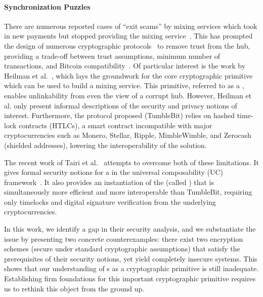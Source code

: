 \paragraph{Synchronization Puzzles} There are numerous reported cases of ``exit scams'' by mixing services which took in new payments but stopped providing the mixing service~\cite{exitscam}. 
This has prompted the design of numerous cryptographic protocols~\cite{FC:BNMCKF14,FCW:ValRow15,coinswap,FCW:HeiBalGol16} to remove trust from the hub, providing a trade-off between trust assumptions, minimum number of transactions, and Bitcoin compatibility~\cite{NDSS:HABSG17}. Of particular interest is the work by Heilman et al.~\cite{NDSS:HABSG17}, which lays the groundwork for the core cryptographic primitive which can be used to build a mixing service. This primitive, referred to as a \emph{\syncpuzzle}, enables unlinkability from even the view of a corrupt hub. However, Heilman et al. only present informal descriptions of the security and privacy notions of interest. Furthermore, the protocol proposed (TumbleBit) relies on hashed time-lock contracts (HTLCs), a smart contract incompatible with major cryptocurrencies such as Monero, Stellar, Ripple, MimbleWimble, and Zerocash (shielded addresses), lowering the interoperability of the solution. 

The recent work of Tairi et al.~\cite{SP:TaiMorMaf21} attempts to overcome both of these limitations. It gives formal security notions for a \syncpuzzle in the universal composability (UC) framework~\cite{FOCS:Canetti01}. It also  provides an instantiation of the \syncpuzzle (called \aal) that is simultaneously more efficient and more interoperable than TumbleBit, requiring only timelocks and digital signature verification from the underlying cryptocurrencies. 

In this work, we identify a gap in their security analysis, and we substantiate the issue by presenting two concrete counterexamples: there exist two encryption schemes (secure under standard cryptographic assumptions) that satisfy the prerequisites of their security notions, yet yield completely insecure systems. This shows that our understanding of {\syncpuzzle}s as a cryptographic primitive is still inadequate. Establishing firm foundations for this important cryptographic primitive requires us to rethink this object from the ground up.